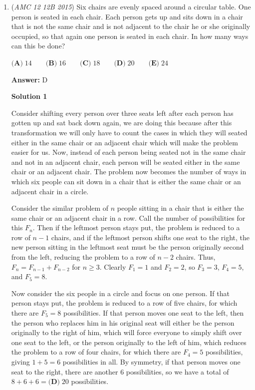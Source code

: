\begin{enumerate}
 Note: Don't try this in an actual exam unless you're really desperate

 


	\item (\textit{AMC 12 12B 2015}) Six chairs are evenly spaced around a circular table. One person is seated in each chair. Each person gets up and sits down in a chair that is not the same chair and is not adjacent to the chair he or she originally occupied, so that again one person is seated in each chair. In how many ways can this be done?


 $\textbf{(A)}\; 14 \qquad\textbf{(B)}\; 16 \qquad\textbf{(C)}\; 18 \qquad\textbf{(D)}\; 20 \qquad\textbf{(E)}\; 24$

 \textbf{Answer: }D



\textbf{Solution 1}

Consider shifting every person over three seats left after each person has gotten up and sat back down again, we are doing this because after this transformation we will only have to count the cases in which they will seated either in the same chair or an adjacent chair which will make the problem easier for us. Now, instead of each person being seated not in the same chair and not in an adjacent chair, each person will be seated either in the same chair or an adjacent chair. The problem now becomes the number of ways in which six people can sit down in a chair that is either the same chair or an adjacent chair in a circle.

 Consider the similar problem of $n$ people sitting in a chair that is either the same chair or an adjacent chair in a row. Call the number of possibilities for this $F_n$. Then if the leftmost person stays put, the problem is reduced to a row of $n-1$ chairs, and if the leftmost person shifts one seat to the right, the new person sitting in the leftmost seat must be the person originally second from the left, reducing the problem to a row of $n-2$ chairs. Thus, $F_n = F_{n-1} + F_{n-2}$ for $n \geq 3$. Clearly $F_1 = 1$ and $F_2 = 2$, so $F_3 = 3$, $F_4 = 5$, and $F_5 = 8$.

 Now consider the six people in a circle and focus on one person. If that person stays put, the problem is reduced to a row of five chairs, for which there are $F_5 = 8$ possibilities. If that person moves one seat to the left, then the person who replaces him in his original seat will either be the person originally to the right of him, which will force everyone to simply shift over one seat to the left, or the person originally to the left of him, which reduces the problem to a row of four chairs, for which there are $F_4 = 5$ possibilities, giving $1 + 5 = 6$ possibilities in all. By symmetry, if that person moves one seat to the right, there are another $6$ possibilities, so we have a total of $8+6+6 = \boxed{\textbf{(D)}\; 20}$ possibilities.


\end{enumerate}
